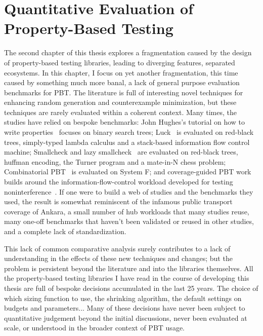 
\renewcommand{\thechapter}{3}

\chapter{Quantitative Evaluation of Property-Based Testing}\label{chap:etna}

The second chapter of this thesis explores a fragmentation caused by the design of
property-based testing libraries, leading to diverging features, separated ecosystems.
In this chapter, I focus on yet another fragmentation, this time caused by something
much more banal, a lack of general purpose evaluation benchmarks for PBT. The
literature is full of interesting novel techniques for enhancing random generation and
counterexample minimization, but these techniques are rarely evaluated within a
coherent context. Many times, the studies have relied on bespoke benchmarks: John
Hughes's tutorial on how to write properties~\cite{Hughes2019HowTS} focuses on binary
search trees; Luck~\cite{Luck} is evaluated on red-black trees, simply-typed lambda
calculus and a stack-based information flow control machine; Smallcheck and lazy
smallcheck~\cite{RuncimanNL08} are evaluated on red-black trees, huffman encoding, the
Turner program and a mate-in-N chess problem; Combinatorial PBT~\cite{CombinatorialPBT}
is evaluated on System F; and coverage-guided PBT work builds around the
information-flow-control workload developed for testing
noninterference~\cite{TestingNoninterferenceQuickly,TestingNIjfp,FuzzChick}. If one
were to build a web of studies and the benchmarks they used, the result is somewhat
reminiscent of the infamous public transport coverage of Ankara, a small number of hub
workloads that many studies reuse, many one-off benchmarks that haven't been validated
or reused in other studies, and a complete lack of standardization.

This lack of common comparative analysis surely contributes to a lack of understanding
in the effects of these new techniques and changes; but the problem is persistent
beyond the literature and into the libraries themselves. All the property-based testing
libraries I have read in the course of developing this thesis are full of bespoke
decisions accumulated in the last 25 years. The choice of which sizing function to use,
the shrinking algorithm, the default settings on budgets and parameters... Many of
these decisions have never been subject to quantitative judgement beyond the initial
discussions, never been evaluated at scale, or understood in the broader context of PBT
usage.

